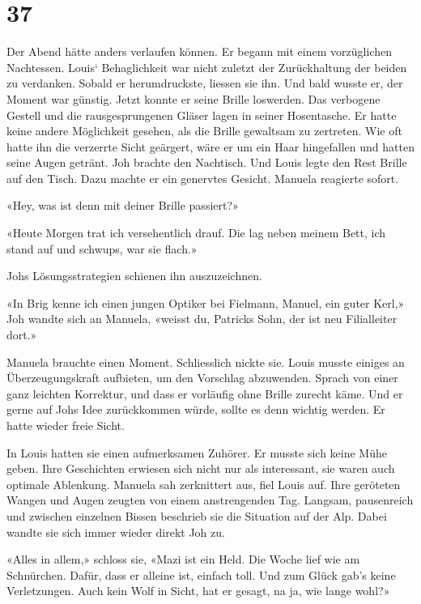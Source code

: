 \chapter{37}



Der Abend hätte anders verlaufen können. 
Er begann mit einem vorzüglichen Nachtessen. Louis` Behaglichkeit war nicht zuletzt der Zurückhaltung der beiden zu verdanken. Sobald er  herumdruckste, liessen sie ihn. Und bald wusste er, der Moment war günstig. Jetzt konnte er seine Brille loswerden. Das verbogene 
Gestell und die rausgesprungenen Gläser lagen in seiner Hosentasche. Er
hatte keine andere Möglichkeit gesehen, als die Brille gewaltsam zu zertreten.
Wie oft hatte ihn die verzerrte Sicht geärgert, wäre er um ein Haar
hingefallen und hatten seine Augen getränt.
Joh brachte den Nachtisch. Und Louis legte den Rest Brille auf den
Tisch. Dazu machte er ein genervtes Gesicht. Manuela reagierte sofort.

«Hey, was ist denn mit deiner Brille passiert?»

«Heute Morgen trat ich versehentlich drauf. Die lag neben meinem Bett,
ich stand auf und schwups, war sie flach.»

Johs Lösungsstrategien schienen ihn auszuzeichnen. 

«In Brig kenne ich einen jungen Optiker bei Fielmann, Manuel, ein guter
Kerl,» Joh wandte sich an Manuela, «weisst du, Patricks Sohn, der ist neu
Filialleiter dort.»

Manuela brauchte einen Moment. Schliesslich nickte sie.
Louis musste einiges an Überzeugungskraft aufbieten, um den Vorschlag
abzuwenden. Sprach von einer ganz leichten Korrektur, und dass er
vorläufig ohne Brille zurecht käme. Und er gerne auf Johs Idee zurückkommen würde, sollte es denn wichtig werden. Er hatte wieder freie Sicht. 

In Louis hatten sie einen aufmerksamen Zuhörer. Er musste sich keine
Mühe geben. Ihre Geschichten erwiesen sich nicht nur als interessant, sie waren auch optimale Ablenkung. Manuela sah zerknittert aus, fiel Louis auf. Ihre geröteten Wangen und
Augen zeugten von einem anstrengenden Tag. Langsam, pausenreich und
zwischen einzelnen Bissen beschrieb sie die Situation auf der Alp. Dabei
wandte sie sich immer wieder direkt Joh zu.

«Alles in allem,» schloss sie, «Mazi ist ein Held. Die Woche lief wie am
Schnürchen. Dafür, dass er alleine ist, einfach toll. Und zum Glück
gab’s keine Verletzungen. Auch kein Wolf in Sicht, hat er gesagt, na ja,
wie lange wohl?»

